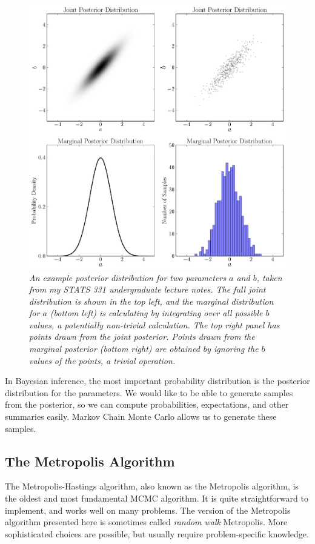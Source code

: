 \begin{figure}
\begin{center}
\includegraphics[scale=0.45]{../marginalisation.pdf}
\caption{\it An example posterior distribution for two parameters $a$ and $b$,
taken from my STATS 331 undergraduate lecture notes.
The full joint distribution is shown in the top left, and the marginal
distribution for $a$ (bottom left) is calculating by integrating over all
possible $b$ values, a potentially non-trivial calculation.
The top right panel has points drawn from the joint
posterior. Points drawn from the marginal posterior (bottom right) are
obtained by ignoring the $b$ values of the points, a trivial operation.
\label{fig:marginalisation}}
\end{center}
\end{figure}

In Bayesian inference, the most important probability distribution is the
posterior distribution for the parameters. We would like to be able to
generate samples from the posterior, so we can compute probabilities,
expectations, and other summaries easily. Markov Chain Monte Carlo allows us
to generate these samples.

\subsection{The Metropolis Algorithm}
The Metropolis-Hastings algorithm, also known as the Metropolis algorithm, is
the oldest and most fundamental MCMC algorithm.
It is quite straightforward to implement, and works well on many problems.
The version of the Metropolis algorithm presented here is sometimes called
{\it random walk} Metropolis. More sophisticated choices are possible,
but usually require problem-specific knowledge.

